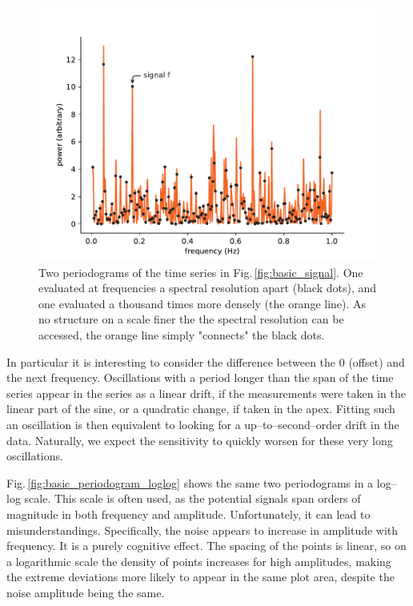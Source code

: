 \begin{figure}
  \centering \includegraphics[width=0.8\linewidth]{gfx/axions/basic_periodogram.pdf}
  \caption{Two periodograms of the time series in Fig.\,\ref{fig:basic_signal}. One evaluated at frequencies a spectral resolution apart (black dots), and one evaluated a thousand times more densely (the orange line). As no structure on a scale finer the the spectral resolution can be accessed, the orange line simply "connects" the black dots.}
  \label{fig:basic_periodogram}
\end{figure}

In particular it is interesting to consider the difference between the 0 (offset) and the next frequency. Oscillations with a period longer than the span of the time series  appear in the series as a linear drift, if the measurements were taken in the linear part of the sine, or a quadratic change, if taken in the apex. Fitting such an oscillation is then equivalent to looking for a up--to--second--order drift in the data. Naturally, we expect the sensitivity to quickly worsen for these very long oscillations.

Fig.\,\ref{fig:basic_periodogram_loglog} shows the same two periodograms in a log--log scale. This scale is often used, as the potential signals span orders of magnitude in both frequency and amplitude. Unfortunately, it can lead to misunderstandings. Specifically, the noise appears to increase in amplitude with frequency. It is a purely cognitive effect. The spacing of the points is linear, so on a logarithmic scale the density of points increases for high amplitudes, making the extreme deviations more likely to appear in the same plot area, despite the noise amplitude being the same.

